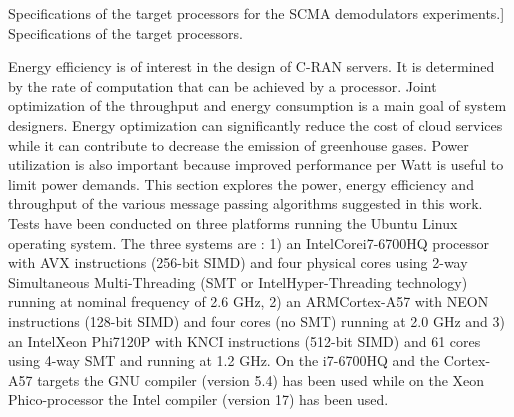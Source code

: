 \begin{table}[htp]
  \centering
  \caption
    [Specifications of the target processors for the SCMA demodulators
     experiments.]
    {Specifications of the target processors.}
  {}
  \label{tab:eval_scma_specs}
\end{table}

Energy efficiency is of interest in the design of C-RAN servers. It is
determined by the rate of computation that can be achieved by a processor.
Joint optimization of the throughput and energy consumption is a main goal of
system designers. Energy optimization can significantly reduce the cost of cloud
services while it can contribute to decrease the emission of greenhouse
gases. Power utilization is also important because improved performance per Watt
is useful to limit power demands. This section explores the power, energy
efficiency and throughput of the various message passing algorithms suggested in
this work. Tests have been conducted on three platforms running the Ubuntu Linux
operating system. The three systems are : 1) an Intel\R Core\TM i7-6700HQ
processor with AVX instructions (256-bit SIMD) and four physical cores using
2-way Simultaneous Multi-Threading (SMT or Intel\R Hyper-Threading technology)
running at nominal frequency of 2.6 GHz, 2) an ARM\R Cortex-A57 with NEON
instructions (128-bit SIMD) and four cores (no SMT) running at 2.0 GHz and 3) an
Intel\R Xeon Phi\TM 7120P with KNCI instructions (512-bit SIMD)
and 61 cores using 4-way SMT and running at 1.2 GHz. On the i7-6700HQ and the
Cortex-A57 targets the GNU compiler (version 5.4) has been used while on the
Xeon Phi\TM co-processor the Intel compiler (version 17) has been used.

